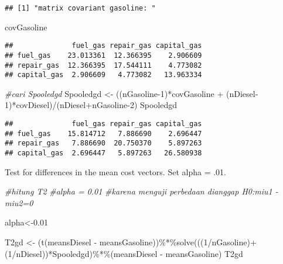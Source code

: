 \documentclass[
]{article}
\newenvironment{Shaded}{\begin{snugshade}}{\end{snugshade}}
\newcommand{\CommentTok}[1]{\textcolor[rgb]{0.56,0.35,0.01}{\textit{#1}}}
\newcommand{\DecValTok}[1]{\textcolor[rgb]{0.00,0.00,0.81}{#1}}
\newcommand{\FloatTok}[1]{\textcolor[rgb]{0.00,0.00,0.81}{#1}}
\newcommand{\FunctionTok}[1]{\textcolor[rgb]{0.00,0.00,0.00}{#1}}
\newcommand{\NormalTok}[1]{#1}
\newcommand{\OtherTok}[1]{\textcolor[rgb]{0.56,0.35,0.01}{#1}}
\newcommand{\SpecialCharTok}[1]{\textcolor[rgb]{0.00,0.00,0.00}{#1}}
\begin{document}
\begin{verbatim}
## [1] "matrix covariant gasoline: "
\end{verbatim}

\begin{Shaded}
\begin{Highlighting}[]
\NormalTok{covGasoline}
\end{Highlighting}
\end{Shaded}

\begin{verbatim}
##              fuel_gas repair_gas capital_gas
## fuel_gas    23.013361  12.366395    2.906609
## repair_gas  12.366395  17.544111    4.773082
## capital_gas  2.906609   4.773082   13.963334
\end{verbatim}

\begin{Shaded}
\begin{Highlighting}[]
\CommentTok{\#cari Spooledgd}
\NormalTok{Spooledgd }\OtherTok{\textless{}{-}}\NormalTok{ ((nGasoline}\DecValTok{{-}1}\NormalTok{)}\SpecialCharTok{*}\NormalTok{covGasoline }\SpecialCharTok{+}\NormalTok{ (nDiesel}\DecValTok{{-}1}\NormalTok{)}\SpecialCharTok{*}\NormalTok{covDiesel)}\SpecialCharTok{/}\NormalTok{(nDiesel}\SpecialCharTok{+}\NormalTok{nGasoline}\DecValTok{{-}2}\NormalTok{)}
\NormalTok{Spooledgd}
\end{Highlighting}
\end{Shaded}

\begin{verbatim}
##              fuel_gas repair_gas capital_gas
## fuel_gas    15.814712   7.886690    2.696447
## repair_gas   7.886690  20.750370    5.897263
## capital_gas  2.696447   5.897263   26.580938
\end{verbatim}

Test for differences in the mean cost vectors. Set alpha = .01.

\begin{Shaded}
\begin{Highlighting}[]
\CommentTok{\#hitung T2}
\CommentTok{\#alpha = 0.01}
\CommentTok{\#karena menguji perbedaan dianggap H0:miu1 {-} miu2=0}

\NormalTok{alpha}\OtherTok{\textless{}{-}}\FloatTok{0.01}

\NormalTok{T2gd }\OtherTok{\textless{}{-}}\NormalTok{ (}\FunctionTok{t}\NormalTok{(meansDiesel }\SpecialCharTok{{-}}\NormalTok{ meansGasoline))}\SpecialCharTok{\%*\%}\FunctionTok{solve}\NormalTok{(((}\DecValTok{1}\SpecialCharTok{/}\NormalTok{nGasoline)}\SpecialCharTok{+}\NormalTok{(}\DecValTok{1}\SpecialCharTok{/}\NormalTok{nDiesel))}\SpecialCharTok{*}\NormalTok{Spooledgd)}\SpecialCharTok{\%*\%}\NormalTok{(meansDiesel }\SpecialCharTok{{-}}\NormalTok{ meansGasoline)}
\NormalTok{T2gd}
\end{Highlighting}
\end{Shaded}
\end{document}
